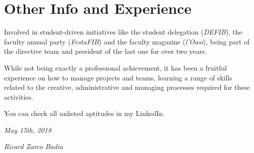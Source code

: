 \documentclass[]{friggeri-cv}
\begin{document}
\section{Other Info and Experience}
Involved in student-driven initiatives like the student delegation (\textit{DEFIB}), the faculty annual party (\textit{FestaFIB}) and the faculty magazine (\textit{l'Oasi}), being part of the directive team and president of the last one for over two years. 

While not being exactly a professional achievement, it has been a fruitful experience on how to manage projects and teams, learning a range of skills related to the creative, administrative and managing processes required for these activities.

You can check all unlisted aptitudes in my LinkedIn.
\\
\begin{flushleft}
\emph{May 15th, 2018}
\end{flushleft}
\begin{flushright}
\emph{Ricard Zarco Badia}
\end{flushright}
\end{document}

